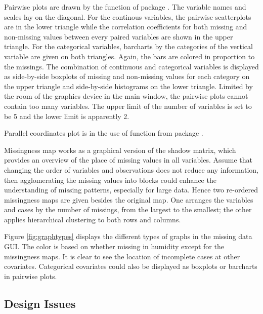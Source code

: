 \documentclass[article]{jss}
\begin{document}
Pairwise plots are drawn by the function  of package  \citep{ggally}. The variable names and scales lay on the diagonal. For the continous variables, the pairwise scatterplots are in the lower triangle while the correlation coefficients for both missing and non-missing values between every paired variables are shown in the upper triangle. For the categorical variables, barcharts by the categories of the vertical variable are given on both triangles. Again, the bars are colored in proportion to the missings. The combination of continuous and categorical variables is displayed as side-by-side boxplots of missing and non-missing values for each category on the upper triangle and side-by-side histograms on the lower triangle. Limited by the room of the graphics device in the main window, the pairwise plots cannot contain too many variables. The upper limit of the number of variables is set to be 5 and the lower limit is apparently 2.

Parallel coordinates plot is in the use of function  from package  \citep{ggplot2}.

Missingness map works as a graphical version of the shadow matrix, which provides an overview of the place of missing values in all variables. Assume that changing the order of variables and observations does not reduce any information, then agglomerating the missing values into blocks could enhance the understanding of missing patterns, especially for large data. Hence two re-ordered missingness maps are given besides the original map. One arranges the variables and cases by the number of missings, from the largest to the smallest; the other applies hierarchical clustering to both rows and columns.

Figure \ref{fig:graphtypes} displays the different types of graphs in the missing data GUI. The color is based on whether missing in humidity except for the missingness maps. It is clear to see the location of incomplete cases at other covariates. Categorical covariates could also be displayed as boxplots or barcharts in pairwise plots. 

\subsection{Design Issues}
\end{document}
